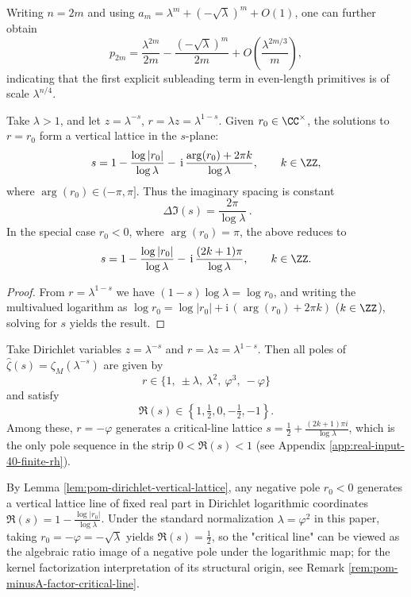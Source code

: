 \begin{remark}\label{rem:pom-prim-even-lower-osc}
Writing $n=2m$ and using $a_{m}=\lambda^{m}+(-\sqrt{\lambda})^{m}+O(1)$, one can further obtain
\[
p_{2m}=\frac{\lambda^{2m}}{2m}-\frac{(-\sqrt{\lambda})^{m}}{2m}
+O\!\left(\frac{\lambda^{2m/3}}{m}\right),
\]
indicating that the first explicit subleading term in even-length primitives is of scale $\lambda^{n/4}$.
\end{remark}

\begin{lemma}\label{lem:pom-dirichlet-vertical-lattice}
Take \(\lambda>1\), and let \(z=\lambda^{-s}\), \(r=\lambda z=\lambda^{1-s}\).
Given \(r_0\in\CC^\times\), the solutions to \(r=r_0\) form a vertical lattice in the \(s\)-plane:
\[
s=1-\frac{\log|r_0|}{\log\lambda}-\,\mathrm{i}\,\frac{\arg(r_0)+2\pi k}{\log\lambda},
\qquad k\in\ZZ,
\]
where \(\arg(r_0)\in(-\pi,\pi]\).
Thus the imaginary spacing is constant
\[
\boxed{\ \Delta\Im(s)=\frac{2\pi}{\log\lambda}\ }.
\]
In the special case \(r_0<0\), where \(\arg(r_0)=\pi\), the above reduces to
\[
s=1-\frac{\log|r_0|}{\log\lambda}-\,\mathrm{i}\,\frac{(2k+1)\pi}{\log\lambda},
\qquad k\in\ZZ.
\]
\end{lemma}
\begin{proof}
From \(r=\lambda^{1-s}\) we have
\(
(1-s)\log\lambda=\log r_0
\), and writing the multivalued logarithm as
\(
\log r_0=\log|r_0|+\mathrm{i}\,(\arg(r_0)+2\pi k)
\) (\(k\in\ZZ\)), solving for \(s\) yields the result.
\end{proof}

\begin{theorem}\label{thm:pom-toy-rh}
Take Dirichlet variables $z=\lambda^{-s}$ and $r=\lambda z=\lambda^{1-s}$. Then all poles of $\widehat{\zeta}(s)=\zeta_M(\lambda^{-s})$ are given by
\[
r\in\{1,\ \pm\lambda,\ \lambda^2,\ \varphi^3,\ -\varphi\}
\]
and satisfy
\[
\Re(s)\in\left\{1,\tfrac12,0,-\tfrac12,-1\right\}.
\]
Among these, $r=-\varphi$ generates a critical-line lattice
\(
s=\tfrac12+\frac{(2k+1)\pi i}{\log\lambda}
\),
which is the only pole sequence in the strip $0<\Re(s)<1$ (see Appendix \ref{app:real-input-40-finite-rh}).
\end{theorem}

\begin{remark}\label{rem:pom-toy-rh-critical-line-log}
By Lemma \ref{lem:pom-dirichlet-vertical-lattice}, any negative pole \(r_0<0\) generates a vertical lattice line of fixed real part in Dirichlet logarithmic coordinates
\(
\Re(s)=1-\frac{\log|r_0|}{\log\lambda}
\).
Under the standard normalization \(\lambda=\varphi^2\) in this paper, taking \(r_0=-\varphi=-\sqrt{\lambda}\) yields
\(
\Re(s)=\tfrac12
\), so the "critical line" can be viewed as the algebraic ratio image of a negative pole under the logarithmic map; for the kernel factorization interpretation of its structural origin, see Remark \ref{rem:pom-minusA-factor-critical-line}.
\end{remark}

